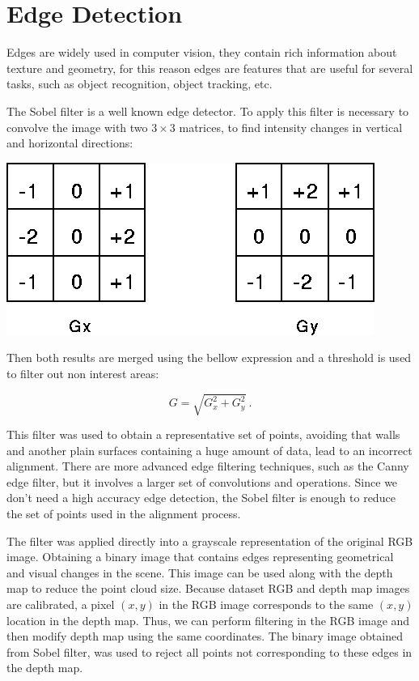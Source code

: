 \section{Edge Detection}

Edges are widely used in computer vision, they contain rich information about texture 
and geometry, for this reason edges are features that are useful for several tasks, 
such as object recognition, object tracking, etc.


The Sobel filter is a well known edge detector. To apply this filter is necessary to 
convolve the image with two $3\times3$ matrices, to find intensity changes in vertical and 
horizontal directions:

\begin{center}
\includegraphics[scale=0.35]{images/sobel}
\end{center}

Then both results are merged using the bellow expression and a threshold is used to filter out non interest areas:

\begin{equation}
G = \sqrt{G_x^2+ G_y^2}\ .
\label{eq:sobelGrad}
\end{equation}

This filter was used to obtain a representative set of points, avoiding that walls and another 
plain surfaces containing a huge amount of data, lead to an incorrect alignment.
There are more advanced edge filtering techniques, such as the Canny edge filter, but it involves 
a larger set of convolutions and operations. Since we don't need a high accuracy edge detection, the Sobel 
filter is enough to reduce the set of points used in the alignment process. 

The filter was applied directly into a grayscale representation of the original RGB image. Obtaining a binary image 
that contains edges representing geometrical and visual changes in the scene. 
This image can be used along with the depth map to reduce the point cloud size. Because dataset RGB and depth map images are 
calibrated, a pixel $(x,y)$ in the RGB image corresponds to the same $(x,y)$ location in the depth map. Thus, we can perform filtering 
in the RGB image and then modify depth map using the same coordinates. The binary image obtained from Sobel filter, was used 
to reject all points not corresponding
to these edges in the depth map. 

